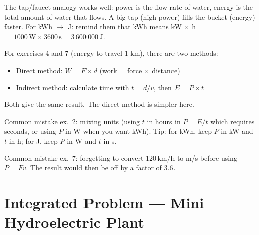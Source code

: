 \documentclass[11pt,a4paper]{article}
\newcommand{\tipbox}[1]{
\begin{tcolorbox}[colback=tipblue!8!white,colframe=tipblue!60!black,title=\textbf{How to explain}]
#1
\end{tcolorbox}
}
\newcommand{\warnbox}[1]{
\begin{tcolorbox}[colback=warnred!8!white,colframe=warnred!60!black,title=\textbf{Common mistakes}]
#1
\end{tcolorbox}
}
\begin{document}
\tipbox{
The tap/faucet analogy works well: power is the flow rate of water, energy is the total amount of water that flows. A big tap (high power) fills the bucket (energy) faster. For kWh $\rightarrow$ J: remind them that kWh means kW $\times$ h $= 1000\,\text{W} \times 3600\,\text{s} = 3\,600\,000\,\text{J}$.

\vspace{0.2cm}
For exercises 4 and 7 (energy to travel 1 km), there are two methods:
\begin{itemize}
\item Direct method: $W = F \times d$ (work = force $\times$ distance)
\item Indirect method: calculate time with $t = d/v$, then $E = P \times t$
\end{itemize}
Both give the same result. The direct method is simpler here.
}

\warnbox{
Common mistake ex.~2: mixing units (using $t$ in hours in $P = E/t$ which requires seconds, or using $P$ in W when you want kWh). Tip: for kWh, keep $P$ in kW and $t$ in h; for J, keep $P$ in W and $t$ in s.

\vspace{0.2cm}
Common mistake ex.~7: forgetting to convert $120\,\text{km/h}$ to m/s before using $P = Fv$. The result would then be off by a factor of $3.6$.
}

\section{Integrated Problem --- Mini Hydroelectric Plant}
\end{document}
